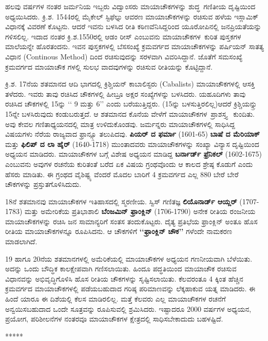 \medskip
ಹಲವು ವರ್ಷಗಳ ನಂತರ ಜರ್ಮನಿಯ ಇಬ್ಬರು ವಿದ್ವಾಂಸರು ಮಾಯಾಚೌಕಗಳನ್ನು \hbox{ಶುದ್ಧ ಗಣಿತೀಯ} ದೃಷ್ಟಿಯಿಂದ ಅಧ್ಯಯಿಸಿದರು. ಕ್ರಿ.ಶ. 1544ರಲ್ಲಿ ಮೈಕೇಲ್ ಸ್ಟಿಫೆಲ್ನು ಆವರಣ ಮಾಯಾಚೌಕಗಳನ್ನು ರಚಿಸುವ ಹಳೆಯ ಇಸ್ಲಾಮಿಕ್ ವಿಧಾನಕ್ಕೆ ವಿವರಣೆ ಕೊಟ್ಟನು. ಆದರೆ ಇವನು ಬಳಸಿದ ರೀತಿ ಕಠಿಣವೆನಿಸಿದ್ದರಿಂದ ಯೂರೋಪಿನಲ್ಲಿ ಜನಪ್ರಿಯತೆಯನ್ನು ಗಳಿಸ\-ಲಿಲ್ಲ. ಇದಾದ ನಂತರ ಕ್ರಿ.ಶ.1550ರಲ್ಲಿ ಆಡಂ ರೀಸ್ ಎಂಬುವನು \hbox{ಮಾಯಾಚೌಕಗಳ ಕುರಿತ} ಪುಸ್ತಕಗಳ ಮಾಲೆಯನ್ನೇ ಹೊರತಂದನು. ಇವನ ಪುಸ್ತಕಗಳಲ್ಲಿ ಬೆಸಸಂಖ್ಯೆ ಕ್ರಮವರ್ಗದ ಮಾಯಾ\-ಚೌಕಗಳನ್ನು ಪರ್ಷಿಯನ್ ಸಾತತ್ಯ ವಿಧಾನ (Continous Method) ದಿಂದ ರಚಿಸು\-ವುದನ್ನು ಸರಳವಾಗಿ ವಿವರಿಸಿದ್ದಾನೆ. ಜೊತೆಗೆ ಸಮಸಂಖ್ಯೆ ಕ್ರಮವರ್ಗದ ಮಾಯಾಚೌಕ ಗಳಲ್ಲಿ ಸುಲಭ ವಾದವುಗಳನ್ನು ರಚಿಸುವ ರೀತಿಯನ್ನು ಕೊಟ್ಟಿದ್ದಾನೆ.

ಕ್ರಿ.ಶ. 17ನೆಯ ಶತಮಾನದ ಆದಿ ಭಾಗದಲ್ಲಿ ಕ್ರಿಶ್ಚಿಯನ್ ಕಾಬಾಲಿಸ್ಟರು (Cabalists) ಮಾಯಾಚೌಕಗಳಲ್ಲಿ ಆಸಕ್ತಿ ತಳೆದರು. ಇವರು ತಾವು ರಚಿಸಿದ ಚೌಕಗಳಲ್ಲಿ ಹೀಬ್ರೂ ಅಕ್ಷರ ಸಂಖ್ಯೆಗಳನ್ನು ಬಳಸಿದರು. ಯಹೂದಿಗಳು ತಾವು ರಚಿಸಿದ ಚೌಕಗಳಲ್ಲಿ 15ನ್ನು ‘‘ 9 ಮತ್ತು 6’’ ಎಂದು ಬರೆಯುತ್ತಿದ್ದರು. (15ನ್ನು ಬಳಸುತ್ತಿರಲಿಲ್ಲ)ಆದರೆ ಕ್ರಿಶ್ಚಿಯನ್ನ್ರು 15ನ್ನೇ ಬಳಸಿರುವುದು ಕಂಡುಬರುತ್ತದೆ. ಆ ಶತಮಾನದ ಕೊನೆಯ ವೇಳೆಗೆ \hbox{ಮಾಯಾಚೌಕಗಳ ಪ್ರಾಶಸ್ತ್ಯ } ಕುಂದಿತು. ಅವು ಕೇವಲ ಗಣಿತಾಧ್ಯಯನದಲ್ಲಿ ಮಾತ್ರ ಉಳಿದುಕೊಂಡವು. ಜರ್ಮನ್ನರು ಮಾಯಾಚೌಕಗಳಲ್ಲಿ ಸಾಧಿಸಿದ್ದ ವಿಷಯಗಳು ನೆರೆಯ ರಾಜ್ಯವಾದ ಫ್ರಾನ್ಸ್ಗೂ ತಲುಪಿದವು. \textbf{ಪಿಯರ್ ದ ಫರ್ಮಾ} (1601-65) \textbf{ಬಾಷೆ ದ ಮೆರಿಯಾಕ್} ಮತ್ತು \textbf{ಫಿಲಿಪ್ ದ ಲಾ ಹೈರ್} (1640-1718) ಮುಂತಾದವರು ಮಾಯಾಚೌಕಗಳನ್ನು ಸಂಖ್ಯಾ ವಿನ್ಯಾಸ ದೃಷ್ಟಿಯಿಂದ ಅಧ್ಯಯನ ಮಾಡಿದರು. ಮಾಯಾಚೌಕಗಳ ಬಗ್ಗೆ ವಿಶೇಷ ಅಧ್ಯಯನ ಮಾಡಿದ್ದ \textbf{ಬರ್ನಾರ್ಡ್ ಫ್ರೆನಿಕಲ್} (1602-1675) ಎಂಬುವನು ಅವುಗಳ ರಚನೆಯ ಕುರಿತಂತೆ ಬರೆದ ಏಕ ವಿಷಯ ಗ್ರಂಥವೊಂದು ಆ ಕಾಲದ ಶ್ರೇಷ್ಠ ಕೊಡುಗೆ ಎಂದು ಹೆಸರು ಮಾಡಿತು. ಈ ಗ್ರಂಥದ \hbox{ವೈಶಿಷ್ಟ್ಯ} ವೆಂದರೆ ಮೊದಲ ಬಾರಿಗೆ 4 ಕ್ರಮವರ್ಗದ ಎಲ್ಲ 880 ಬೇರೆ ಬೇರೆ ಚೌಕಗಳನ್ನು ಪ್ರಸ್ತುತ\break ಗೊಳಿಸಿದುದು.

18ನೆ ಶತಮಾನವು ಮಾಯಾಚೌಕಗಳ ಇತಿಹಾಸದಲ್ಲಿ ಸ್ಮರಣೀಯ. ಸ್ವಿಸ್ ಗಣಿತಜ್ಞ \linebreak \textbf{ಲಿಯೊನಾರ್ಡ್ ಆಯ್ಲರ್} (1707-1783) ಮತ್ತು ಅಮೇರಿಕೆಯ ಪ್ರತಿಭಾಶಾಲಿ \textbf{ಬೆಂಜಮಿನ್ ಫ್ರಾಂಕ್ಲಿನ್} (1706-1790) ಅನೇಕ ರೀತಿಯ ರಂಜನೀಯ ಮಾಯಾಚೌಕಗಳನ್ನು ರಚಿಸಿ ಜನ ಸಾಮಾನ್ಯರಿಗೆ ಸಂತಸ ತಂದುಕೊಟ್ಟರು. ದೈತ್ಯ ಪ್ರತಿಭೆಯ ಫ್ರಾಂಕ್ಲಿನ್ ಅಂತೂ ಹೊಸ ರೀತಿಯ ಮಾಯಾಚೌಕಗಳನ್ನೂ ರೂಪಿಸಿದನು. ಆ ಚೌಕಗಳಿಗೆ \textbf{‘‘ಫ್ರಾಂಕ್ಲಿನ್ ಚೌಕ’’} ಗಳೆಂದೇ ನಾಮ\-ಕರಣ ಮಾಡಲಾಗಿದೆ.

19 ಹಾಗೂ 20ನೆಯ ಶತಮಾನಗಳಲ್ಲಿ ಅಮೆರಿಕೆಯಲ್ಲಿ ಮಾಯಾಚೌಕಗಳ ಅಧ್ಯಯನ ಗಣನೀಯವಾಗಿ ಬೆಳೆಯಿತು. ಅದನ್ನು ಒಂದು ಬೌದ್ಧಿಕ ಕಾಲಕ್ಷೇಪವಾಗಿ ಗಣಿಸಲಾಯಿತು. ಹಿಂದೂ ಪದ್ಧತಿಯಿಂದ ಮಾಯಾಚೌಕ ರಚಿಸುವ ವಿಧಾನವನ್ನು ಅಭಿವೃದ್ಧಿಗೊಳಿಸಿ ಹೊಸ ರೀತಿಯ ಚೌಕಗಳನ್ನು ಸೃಷ್ಟಿಸಲಾಯಿತು. ಕೆಲವರಂತೂ 4 ಕ್ಕಿಂತ ಹೆಚ್ಚಿನ ಕ್ರಮವರ್ಗದ ಮಾಯಾಚೌಕಗಳಲ್ಲಿ ಪಡೆಯಬಹುದಾದ ಗರಿಷ್ಠ ಪರಿಮಾಣವನ್ನು ಲೆಕ್ಕಹಾಕುವ ಯತ್ನ ಮಾಡಿದರು. ಈ ಹಿಂದೆ ಯಾರೂ ಈ ದಿಶೆಯಲ್ಲಿ ಕೆಲಸ ಮಾಡಿರಲಿಲ್ಲ. ಮತ್ತೆ ಕೆಲವರು ಎಲ್ಲ ಮಾಯಾಚೌಕಗಳ ರಚನೆಗೆ ಅನ್ವಯಿಸಬಹುದಾದ ಒಂದೇ ಸೂತ್ರವನ್ನು ರೂಪಿಸುವಲ್ಲಿ ಶ್ರಮಿಸಿದರು. \hbox{ಇಷ್ಟಾದರೂ} 2000 ವರ್ಷಗಳ ಅಧ್ಯಯನ, ಪ್ರಯೋಗ, ಪರಿಶೀಲನೆಗಳ ನಂತರವೂ ಮಾಯಾಚೌಕಗಳ \linebreak ಕ್ಷೇತ್ರದಲ್ಲಿ ಸಾಧಿಸಬೇಕಾದುದು ಬಹಳಷ್ಟಿದೆ.
\begin{center}
*****
\end{center}
